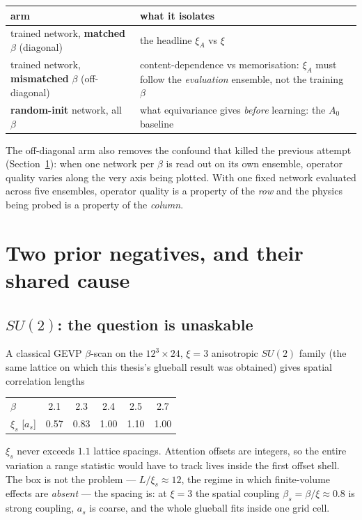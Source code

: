 \documentclass[11pt,a4paper]{article}
\newcommand{\xiA}{\xi_A}
\begin{document}
\begin{center}
\small
\begin{tabular}{@{}l@{\quad}p{7.6cm}@{}}
\toprule
arm & what it isolates \\
\midrule
trained network, \textbf{matched} $\beta$ (diagonal)
  & the headline $\xiA$ vs $\xi$ \\[2pt]
trained network, \textbf{mismatched} $\beta$ (off-diagonal)
  & content-dependence vs memorisation: $\xiA$ must follow the
    \emph{evaluation} ensemble, not the training $\beta$ \\[2pt]
\textbf{random-init} network, all $\beta$
  & what equivariance gives \emph{before} learning: the $A_0$ baseline \\
\bottomrule
\end{tabular}
\end{center}

The off-diagonal arm also removes the confound that killed the previous attempt
(Section~\ref{sec:failures}): when one network per $\beta$ is read out on its
own ensemble, operator quality varies along the very axis being plotted. With
one fixed network evaluated across five ensembles, operator quality is a
property of the \emph{row} and the physics being probed is a property of the
\emph{column}.

\section{Two prior negatives, and their shared cause}
\label{sec:failures}

\subsection{$SU(2)$: the question is unaskable}

A classical GEVP $\beta$-scan on the $12^3\times24$, $\xi=3$ anisotropic
$SU(2)$ family (the same lattice on which this thesis's glueball result was
obtained) gives spatial correlation lengths
\begin{center}
\begin{tabular}{@{}lccccc@{}}
\toprule
$\beta$ & 2.1 & 2.3 & 2.4 & 2.5 & 2.7 \\
$\xi_s$ [$a_s$] & 0.57 & 0.83 & 1.00 & 1.10 & 1.00 \\
\bottomrule
\end{tabular}
\end{center}
$\xi_s$ never exceeds $1.1$ lattice spacings. Attention offsets are integers, so
the entire variation a range statistic would have to track lives inside the
first offset shell. The box is not the problem --- $L/\xi_s \approx 12$, the
regime in which finite-volume effects are \emph{absent} --- the spacing is: at
$\xi=3$ the spatial coupling $\beta_s = \beta/\xi \approx 0.8$ is strong
coupling, $a_s$ is coarse, and the whole glueball fits inside one grid cell.
\end{document}
